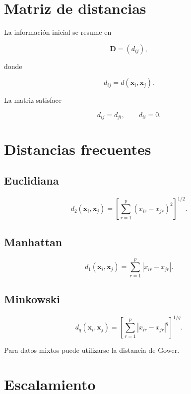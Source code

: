 \documentclass[
  spanish,
  10.5pt,
  letterpaper,
  DIV=11,
  numbers=noendperiod,
  oneside,
  open=any]{scrreprt}
\theoremstyle{definition}
\theoremstyle{definition}
\theoremstyle{plain}
\theoremstyle{remark}
\begin{document}
\section*{Matriz de distancias}\label{matriz-de-distancias}


La información inicial se resume en

\[
\mathbf{D}=(d_{ij}),
\]

donde

\[
d_{ij}=d(\mathbf{x}_i,\mathbf{x}_j).
\]

La matriz satisface

\[
d_{ij}=d_{ji},
\qquad
d_{ii}=0.
\]

\section*{Distancias frecuentes}\label{distancias-frecuentes}


\subsection*{Euclidiana}\label{euclidiana}

\[
d_2(\mathbf{x}_i,\mathbf{x}_j)
=
\left[
\sum_{r=1}^{p}(x_{ir}-x_{jr})^2
\right]^{1/2}.
\]

\subsection*{Manhattan}\label{manhattan}

\[
d_1(\mathbf{x}_i,\mathbf{x}_j)
=
\sum_{r=1}^{p}|x_{ir}-x_{jr}|.
\]

\subsection*{Minkowski}\label{minkowski}

\[
d_q(\mathbf{x}_i,\mathbf{x}_j)
=
\left[
\sum_{r=1}^{p}|x_{ir}-x_{jr}|^q
\right]^{1/q}.
\]

Para datos mixtos puede utilizarse la distancia de Gower.

\section*{Escalamiento}\label{escalamiento-3}
\end{document}
